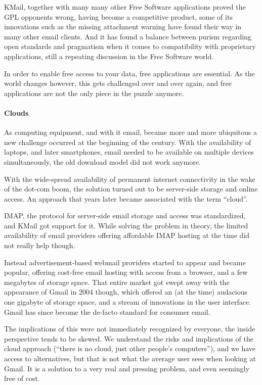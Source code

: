 KMail, together with many many other Free Software applications proved the GPL opponents wrong, having become a competitive product, some of its innovations such as the missing attachment warning have found their way in many other email clients. And it has found a balance between purism regarding open standards and pragmatism when it comes to compatibility with proprietary applications, still a repeating discussion in the Free Software world.

In order to enable free access to your data, free applications are essential. As the world changes however, this gets challenged over and over again, and free applications are not the only piece in the puzzle anymore.

\paragraph{Clouds}

As computing equipment, and with it email, became more and more ubiquitous a new challenge occurred at the beginning of the century. With the availability of laptops, and later smartphones, email needed to be available on multiple devices simultaneously, the old download model did not work anymore.

With the wide-spread availability of permanent internet connectivity in the wake of the dot-com boom, the solution turned out to be server-side storage and online access. An approach that years later became associated with the term “cloud”.

IMAP, the protocol for server-side email storage and access was standardized, and KMail got support for it. While solving the problem in theory, the limited availability of email providers offering affordable IMAP hosting at the time did not really help though.

Instead advertisement-based webmail providers started to appear and became popular, offering cost-free email hosting with access from a browser, and a few megabytes of storage space. That entire market got swept away with the appearance of Gmail in 2004 though, which offered an (at the time) audacious one gigabyte of storage space, and a stream of innovations in the user interface. Gmail has since become the de-facto standard for consumer email.

The implications of this were not immediately recognized by everyone, the inside perspective tends to be skewed. We understand the risks and implications of the cloud approach (“there is no cloud, just other people's computers”), and we have access to alternatives, but that is not what the average user sees when looking at Gmail. It is a solution to a very real and pressing problem, and even seemingly free of cost.

